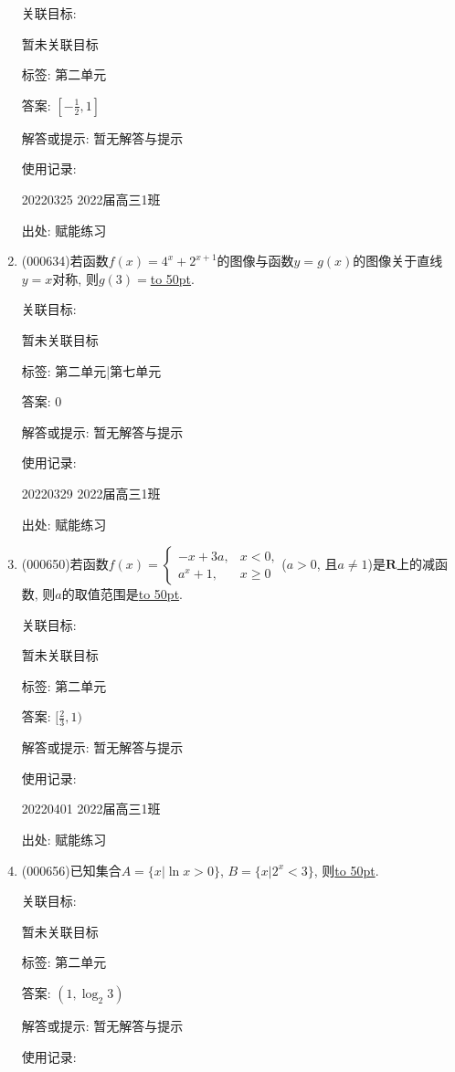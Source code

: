 \documentclass[10pt,a4paper]{article}
\newcommand{\blank}[1]{\underline{\hbox to #1pt{}}}
\begin{document}
\begin{enumerate}[1.]
关联目标:

暂未关联目标



标签: 第二单元

答案: $[-\frac 12,1]$

解答或提示: 暂无解答与提示

使用记录:

20220325	2022届高三1班	


出处: 赋能练习
\item { (000634)}若函数$f(x)=4^x+2^{x+1}$的图像与函数$y=g(x)$的图像关于直线$y=x$对称, 则$g(3)=$\blank{50}.


关联目标:

暂未关联目标



标签: 第二单元|第七单元

答案: $0$

解答或提示: 暂无解答与提示

使用记录:

20220329	2022届高三1班	


出处: 赋能练习
\item { (000650)}若函数$f(x)=\begin{cases} -x+3a, & x<0,  \\ a^x+1, & x\ge 0 \end{cases}$($a>0$, 且$a\ne 1$)是$\mathbf{R}$上的减函数, 则$a$的取值范围是\blank{50}.


关联目标:

暂未关联目标



标签: 第二单元

答案: $[\frac 23,1)$

解答或提示: 暂无解答与提示

使用记录:

20220401	2022届高三1班	


出处: 赋能练习
\item { (000656)}已知集合$A=\{x|\ln x>0 \}$, $B=\{x|2^x<3\}$, 则\blank{50}.


关联目标:

暂未关联目标



标签: 第二单元

答案: $(1,\log_2 3)$

解答或提示: 暂无解答与提示

使用记录:


\end{enumerate}
\end{document}
